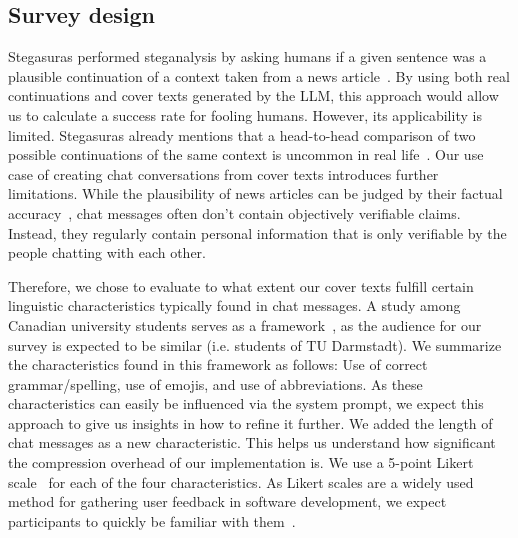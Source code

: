 \subsection{Survey design}
\label{sec:surveyDesign}
Stegasuras performed steganalysis by asking humans if a given sentence was a plausible continuation of a context taken from a news article~\cite{zieglerNeuralLinguisticSteganography2019}. By using both real continuations and cover texts generated by the \gls{LLM}, this approach would allow us to calculate a success rate for fooling humans. However, its applicability is limited. Stegasuras already mentions that a head-to-head comparison of two possible continuations of the same context is uncommon in real life~\cite{zieglerNeuralLinguisticSteganography2019}. Our use case of creating chat conversations from cover texts introduces further limitations. While the plausibility of news articles can be judged by their factual accuracy~\cite{zieglerNeuralLinguisticSteganography2019}, chat messages often don't contain objectively verifiable claims. Instead, they regularly contain personal information that is only verifiable by the people chatting with each other.

Therefore, we chose to evaluate to what extent our cover texts fulfill certain linguistic characteristics typically found in chat messages. A study among Canadian university students serves as a framework~\cite{alazzawieLinguisticSituationalFeatures2022}, as the audience for our survey is expected to be similar (i.e. students of TU Darmstadt). We summarize the characteristics found in this framework as follows: Use of correct grammar/spelling, use of emojis, and use of abbreviations. As these characteristics can easily be influenced via the system prompt, we expect this approach to give us insights in how to refine it further. We added the length of chat messages as a new characteristic. This helps us understand how significant the compression overhead of our implementation is. We use a 5-point Likert scale~\cite{likertTechniqueMeasurementAttitudes1932} for each of the four characteristics. As Likert scales are a widely used method for gathering user feedback in software development, we expect participants to quickly be familiar with them~\cite{girayAssessmentStudentSatisfaction2021,tizardVoiceUsersExtended2022}.

